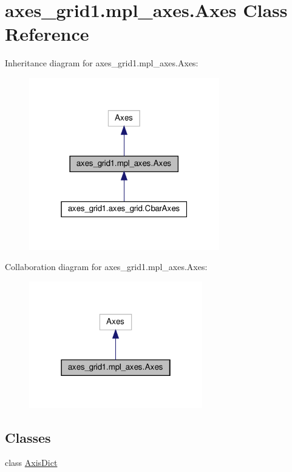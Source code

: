 \hypertarget{classaxes__grid1_1_1mpl__axes_1_1Axes}{}\section{axes\+\_\+grid1.\+mpl\+\_\+axes.\+Axes Class Reference}
\label{classaxes__grid1_1_1mpl__axes_1_1Axes}


Inheritance diagram for axes\+\_\+grid1.\+mpl\+\_\+axes.\+Axes\+:
\nopagebreak
\begin{figure}[H]
\begin{center}
\leavevmode
\includegraphics[width=235pt]{classaxes__grid1_1_1mpl__axes_1_1Axes__inherit__graph}
\end{center}
\end{figure}


Collaboration diagram for axes\+\_\+grid1.\+mpl\+\_\+axes.\+Axes\+:
\nopagebreak
\begin{figure}[H]
\begin{center}
\leavevmode
\includegraphics[width=214pt]{classaxes__grid1_1_1mpl__axes_1_1Axes__coll__graph}
\end{center}
\end{figure}
\subsection*{Classes}
\begin{DoxyCompactItemize}
\item 
class \hyperlink{classaxes__grid1_1_1mpl__axes_1_1Axes_1_1AxisDict}{Axis\+Dict}
\end{DoxyCompactItemize}
